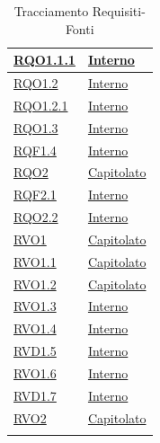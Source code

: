 \begin{longtable}{|>{\centering}m{5cm}|m{5cm}<{\centering}|}
\hyperlink{RQO1.1.1}{RQO1.1.1} & \hyperlink{Interno}{Interno}\\ \hline

\hyperlink{RQO1.2}{RQO1.2} & \hyperlink{Interno}{Interno}\\ \hline

\hyperlink{RQO1.2.1}{RQO1.2.1} & \hyperlink{Interno}{Interno}\\ \hline

\hyperlink{RQO1.3}{RQO1.3} & \hyperlink{Interno}{Interno}\\ \hline

\hyperlink{RQF1.4}{RQF1.4} & \hyperlink{Interno}{Interno}\\ \hline

\hyperlink{RQO2}{RQO2} & \hyperlink{Capitolato}{Capitolato}\\ \hline

\hyperlink{RQF2.1}{RQF2.1} & \hyperlink{Interno}{Interno}\\ \hline

\hyperlink{RQO2.2}{RQO2.2} & \hyperlink{Interno}{Interno}\\ \hline

\hyperlink{RVO1}{RVO1} & \hyperlink{Capitolato}{Capitolato}\\ \hline

\hyperlink{RVO1.1}{RVO1.1} & \hyperlink{Capitolato}{Capitolato}\\ \hline

\hyperlink{RVO1.2}{RVO1.2} & \hyperlink{Capitolato}{Capitolato}\\ \hline

\hyperlink{RVO1.3}{RVO1.3} & \hyperlink{Interno}{Interno}\\ \hline

\hyperlink{RVO1.4}{RVO1.4} & \hyperlink{Interno}{Interno}\\ \hline

\hyperlink{RVD1.5}{RVD1.5} & \hyperlink{Interno}{Interno}\\ \hline

\hyperlink{RVO1.6}{RVO1.6} & \hyperlink{Interno}{Interno}\\ \hline

\hyperlink{RVD1.7}{RVD1.7} & \hyperlink{Interno}{Interno}\\ \hline

\hyperlink{RVO2}{RVO2} & \hyperlink{Capitolato}{Capitolato}\\ \hline

\caption[Tracciamento Requisiti-Fonti]{Tracciamento Requisiti-Fonti}
\label{tabella:requi-fonti}
\end{longtable}
\clearpage

